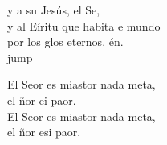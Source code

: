 \begin{cancion}
	y a su  Jesús, el Se,\\
	y al Eíritu que habita e mundo\\
	por los glos eternos. én.\\jump\\
	\begin{chorus}%
	El Seor es miastor nada meta,\\
	el ñor ei paor.\\
	El Seor es miastor nada meta,\\
	el ñor esi paor.\\
	\end{chorus}%
	\jump\\
\end{cancion}%
